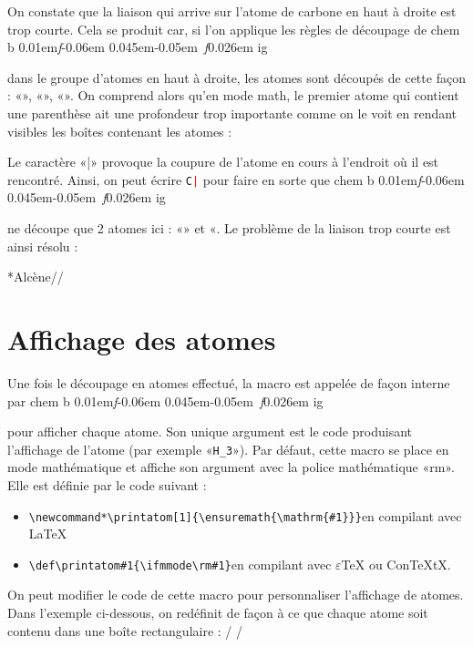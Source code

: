 \documentclass[10pt,french]{article}
\makeatletter
\newcommand\make@car@active[1]{%
	\catcode`#1\active
	\begingroup
		\lccode`\~`#1\relax
		\lowercase{\endgroup\def~}%
}
\newif\if@exstar
\newcommand\exemple{%
	\begingroup
	\parskip\z@
	\@makeother\;\@makeother\!\@makeother\?\@makeother\:%
	\@ifstar{\@exstartrue\exemple@}{\@exstarfalse\exemple@}}
\newcommand\exemple@[2][65]{%
	\medbreak\noindent
	\begingroup
		\let\do\@makeother\dospecials
		\make@car@active\ { {}}%
		\make@car@active\^^M{\par\leavevmode}%
		\make@car@active\^^I{\space\space}%
		\make@car@active\,{\leavevmode\kern\z@\string,}%
		\make@car@active\-{\leavevmode\kern\z@\string-}%
		\make@car@active\>{\leavevmode\kern\z@\string>}%
		\make@car@active\<{\leavevmode\kern\z@\string<}%
		\exemple@@{#1}{#2}%
}
\newcommand\exemple@@[3]{%
	\def\@tempa##1#3{\exemple@@@{#1}{#2}{##1}}%
	\@tempa
}
\newcommand\exemple@@@[3]{%
	\xdef\the@code{#3}%
	\endgroup
	\if@exstar
		\begingroup
			\fboxrule0.4pt
			\let\breakboxparindent\z@
			\def\bkvz@bottom{\hrule\@height\fboxrule}%
			\let\bkvz@before@breakbox\relax
			\def\bkvz@set@linewidth{\advance\linewidth\dimexpr-2\fboxrule-2\fboxsep}%
			\def\bkvz@left{\vrule\@width\fboxrule\hskip\fboxsep}%
			\def\bkvz@right{\hskip\fboxsep\vrule\@width\fboxrule}%
			\def\bkvz@top{\hbox to \hsize{%
				\vrule\@width\fboxrule\@height\fboxrule
				\leaders\bkvz@bottom\hfill
				\sffamily
				\fboxsep\z@
				\colorbox{black}{\kern0.25em\color{white}\footnotesize\lower0.5ex\hbox{\strut#2}\kern0.25em}%
				\leaders\bkvz@bottom\hfill
				\vrule\@width\fboxrule\@height\fboxrule}}%
			\breakbox
				\kern.5ex\relax
				\ttfamily\footnotesize\the@code\par
				\normalfont
				\kern3pt
				\hrule height0.1pt width\linewidth depth0.1pt
				\vskip5pt
				\rightskip0pt plus 1fill
				\everypar{{\color{lightgray}\rlap{\vrule height0.1pt width\linewidth depth0.1pt}}\hskip0pt plus 1fill}%
				\newlinechar`\^^M\everyeof{\noexpand}\scantokens{#3}\par
			\endbreakbox
		\endgroup
	\else
		\vskip0.5ex
		\boxput*(0,1)
			{\fboxsep\z@
			\hbox{\sffamily\colorbox{black}{\leavevmode\kern0.25em{\color{white}\footnotesize\strut#2}\kern0.25em}}%
			}%
			{\fboxsep5pt
			\fbox{%
				$\vcenter{\hsize\dimexpr0.#1\linewidth-\fboxsep-\fboxrule\relax
					\kern5pt\parskip0pt \ttfamily\footnotesize\the@code}%
				\vcenter{\kern5pt\hsize\dimexpr\linewidth-0.#1\linewidth-\fboxsep-\fboxrule\relax
					\everypar{{\color{lightgray}\rlap{\vrule height0.1pt width\dimexpr\linewidth-0.#1\linewidth-\fboxsep-\fboxrule depth0.1pt}}}%
					\footnotesize\newlinechar`\^^M\everyeof{\noexpand}\scantokens{#3}}$%
				}%
			}%
	\fi
	\medbreak
	\endgroup
}
\newcommand\falseverb[1]{{\ttfamily\detokenize\expandafter{\string#1}}}
\let\do\@makeother\dospecials
\DeclareRobustCommand\CF{%
	\textsf{%
		chem%
		\if\string b\detokenize\expandafter{\f@series}%
			\lower0.01em\hbox{\itshape f}\kern-0.06em
		\else
			\lower0.045em\hbox{\kern-0.05em \itshape f}\kern0.026em
		\fi ig%
		}%
		\xspace
}
\makeatother
\begin{document}
On constate que la liaison qui arrive sur l'atome de carbone en haut à droite est trop courte. Cela se produit car, si l'on applique les règles de découpage de \CF dans le groupe d'atomes en haut à droite, les atomes sont découpés de cette façon : «\texttt{}», «\texttt{}», «\texttt{}». On comprend alors qu'en mode math, le premier atome qui contient une parenthèse ait une profondeur trop importante comme on le voit en rendant visibles les boîtes contenant les atomes :
\begin{center}
\fboxsep=0pt
\renewcommand*\printatom[1]{\fbox{\ensuremath{\mathrm{#1}}}}%
%
\end{center}
Le caractère «|» provoque la coupure de l'atome en cours à l'endroit où il est rencontré. Ainsi, on peut écrire \texttt{C\textcolor{red}{|}} pour faire en sorte que \CF ne découpe que 2 atomes ici : «\texttt{}» et «\texttt{}. Le problème de la liaison trop courte est ainsi résolu :

\exemple*{Alcène}//

\section{Affichage des atomes}\label{perso.affichage}
Une fois le découpage en atomes effectué, la macro \falseverb{\printatom} est appelée de façon interne par \CF pour afficher chaque atome. Son unique argument est le code produisant l'affichage de l'atome (par exemple «\verb-H_3-»). Par défaut, cette macro se place en mode mathématique et affiche son argument avec la police mathématique «rm». Elle est définie par le code suivant :
\begin{itemize}
	\item \verb|\newcommand*\printatom[1]{\ensuremath{\mathrm{#1}}}|\qquad en compilant avec \LaTeX{}
	\item \verb|\def\printatom#1{\ifmmode\rm#1\else$\rm#1$\fi}|\qquad en compilant avec $\varepsilon$\TeX{} ou Con\TeX tX.
\end{itemize}\medskip

On peut modifier le code de cette macro pour personnaliser l'affichage de atomes. Dans l'exemple ci-dessous, on redéfinit \falseverb{\printatom} de façon à ce que chaque atome soit contenu dans une boîte rectangulaire :
\exemple{Redéfinition de \string\printatom}/\fboxsep=1pt
\renewcommand*\printatom[1]{\fbox{\ensuremath{\mathrm{#1}}}}
/
\end{document}
